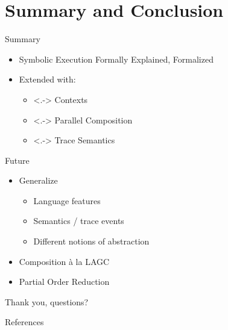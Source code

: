 \documentclass{beamer}
\begin{document}
\section{Summary and Conclusion}

\begin{frame}{Summary}
  \begin{itemize}[<+->]
    \item Symbolic Execution Formally Explained, Formalized
    \item Extended with:
          \begin{itemize}
            \item<.-> Contexts
            \item<.-> Parallel Composition
            \item<.-> Trace Semantics
          \end{itemize}
  \end{itemize}
\end{frame}

\begin{frame}{Future}
  \begin{itemize}[<+->]
    \item Generalize
          \begin{itemize}
            \item Language features
            \item Semantics / trace events
            \item Different notions of abstraction
          \end{itemize}
    \item Composition à la LAGC
    \item \alert{Partial Order Reduction}
  \end{itemize}
\end{frame}

\begin{frame}
  Thank you, questions?
\end{frame}

\begin{frame}{References}
  \printbibliography{}
\end{frame}
\end{document}
